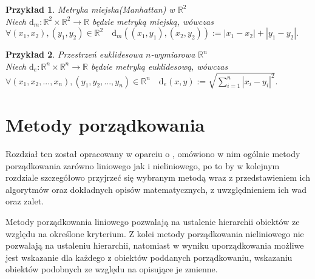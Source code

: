 \documentclass[12pt,a4paper]{report}
\newtheorem{example}{Przykład}
\begin{document}
\begin{example}{Metryka miejska(Manhattan) w $\mathbb{R}^2$}\\
Niech $\mathrm{d}_m: \mathbb{R}^2 \times \mathbb{R}^2 \rightarrow \mathbb{R}$ będzie metryką miejską, wówczas \\
$\forall{(x_{1},x_{2}),(y_{1},y_{2}) \in \mathbb{R}^2} \quad \mathrm{d}_m((x_1,y_1),(x_2,y_2)):=|x_1-x_2|+|y_1-y_2|.$\\
\end{example}

\begin{example}{Przestrzeń euklidesowa $n$-wymiarowa $\mathbb{R}^n$\\}
Niech $\mathrm{d}_e: \mathbb{R}^n \times \mathbb{R}^n \rightarrow \mathbb{R}$ będzie metryką euklidesową, wówczas\\   $\forall{(x_1,x_2,...,x_n),(y_1,y_2,...,y_n) \in \mathbb{R}^n} \quad \mathrm{d}_e(x,y):= \sqrt{\sum_{i=1}^{n} |x_i-y_i|^2}.$\
\end{example}



\chapter{Metody porządkowania}
\noindent

Rozdział ten został opracowany w oparciu o \cite[Rozdział 2]{panek2013}, omówiono w nim ogólnie metody porządkowania zarówno liniowego jak i nieliniowego, po to by w kolejnym rozdziale szczegółowo przyjrzeć się wybranym metodą wraz z przedstawieniem ich algorytmów oraz dokładnych opisów matematycznych, z uwzględnieniem ich wad oraz zalet.


Metody porządkowania liniowego pozwalają na ustalenie hierarchii obiektów ze względu na określone kryterium. Z kolei metody porządkowania nieliniowego nie pozwalają na ustaleniu hierarchii, natomiast w wyniku uporządkowania możliwe jest wskazanie dla każdego z obiektów poddanych porządkowaniu, wskazaniu obiektów podobnych ze względu na opisujące je zmienne. 
\end{document}
